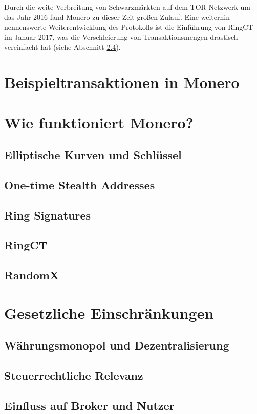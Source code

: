 Durch die weite Verbreitung von Schwarzmärkten auf dem TOR-Netzwerk um das Jahr 2016 fand Monero zu dieser Zeit großen Zulauf. Eine weiterhin nennenswerte Weiterentwicklung des Protokolls ist die Einführung von RingCT im Januar 2017,
was die Verschleierung von Transaktionsmengen drastisch vereinfacht hat (siehe Abschnitt \ref{ringct}).
\chapter{Beispieltransaktionen in Monero}

\chapter{Wie funktioniert Monero?} \label{tech}

\section{Elliptische Kurven und Schlüssel}

\section{One-time Stealth Addresses} \label{stealth}

\section{Ring Signatures} \label{ringsig}

\section{RingCT} \label{ringct}

\section{RandomX}

\chapter{Gesetzliche Einschränkungen} \label{legal}

\section{Währungsmonopol und Dezentralisierung}

\section{Steuerrechtliche Relevanz}

\section{Einfluss auf Broker und Nutzer}